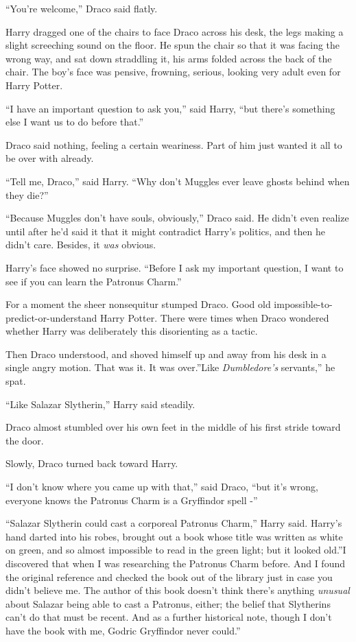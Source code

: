 ``You're welcome,'' Draco said flatly.

Harry dragged one of the chairs to face Draco across his desk, the legs
making a slight screeching sound on the floor. He spun the chair so that
it was facing the wrong way, and sat down straddling it, his arms folded
across the back of the chair. The boy's face was pensive, frowning,
serious, looking very adult even for Harry Potter.

``I have an important question to ask you,'' said Harry, ``but there's
something else I want us to do before that.''

Draco said nothing, feeling a certain weariness. Part of him just wanted
it all to be over with already.

``Tell me, Draco,'' said Harry. ``Why don't Muggles ever leave ghosts
behind when they die?''

``Because Muggles don't have souls, obviously,'' Draco said. He didn't
even realize until after he'd said it that it might contradict Harry's
politics, and then he didn't care. Besides, it \emph{was} obvious.

Harry's face showed no surprise. ``Before I ask my important question, I
want to see if you can learn the Patronus Charm.''

For a moment the sheer nonsequitur stumped Draco. Good old
impossible-to-predict-or-understand Harry Potter. There were times when
Draco wondered whether Harry was deliberately this disorienting as a
tactic.

Then Draco understood, and shoved himself up and away from his desk in a
single angry motion. That was it. It was over.''Like \emph{Dumbledore's}
servants,'' he spat.

``Like Salazar Slytherin,'' Harry said steadily.

Draco almost stumbled over his own feet in the middle of his first
stride toward the door.

Slowly, Draco turned back toward Harry.

``I don't know where you came up with that,'' said Draco, ``but it's
wrong, everyone knows the Patronus Charm is a Gryffindor spell -''

``Salazar Slytherin could cast a corporeal Patronus Charm,'' Harry said.
Harry's hand darted into his robes, brought out a book whose title was
written as white on green, and so almost impossible to read in the green
light; but it looked old.''I discovered that when I was researching the
Patronus Charm before. And I found the original reference and checked
the book out of the library just in case you didn't believe me. The
author of this book doesn't think there's anything \emph{unusual} about
Salazar being able to cast a Patronus, either; the belief that
Slytherins can't do that must be recent. And as a further historical
note, though I don't have the book with me, Godric Gryffindor never
could.''

